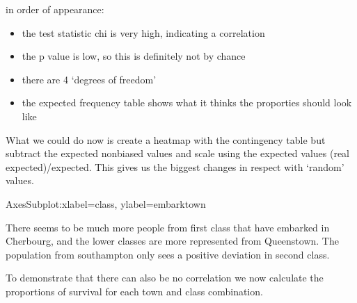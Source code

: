 \documentclass[letterpaper,10pt,english]{jupyterBook}
\begin{document}
\sphinxAtStartPar
in order of appearance:
\begin{itemize}
\item {} 
\sphinxAtStartPar
the test statistic chi is very high, indicating a correlation

\item {} 
\sphinxAtStartPar
the p value is low, so this is definitely not by chance

\item {} 
\sphinxAtStartPar
there are 4 ‘degrees of freedom’

\item {} 
\sphinxAtStartPar
the expected frequency table shows what it thinks the proporties should look like

\end{itemize}

\sphinxAtStartPar
What we could do now is create a heatmap with the contingency table but subtract the expected non\sphinxhyphen{}biased values and scale using the expected values (real \sphinxhyphen{} expected)/expected.
This gives us the biggest changes in respect with ‘random’ values.

\begin{sphinxVerbatim}[commandchars=\\\{\}]
      
\end{sphinxVerbatim}

\begin{sphinxVerbatim}[commandchars=\\\{\}]
\PYGZlt{}AxesSubplot:xlabel=\PYGZsq{}class\PYGZsq{}, ylabel=\PYGZsq{}embark\PYGZus{}town\PYGZsq{}\PYGZgt{}
\end{sphinxVerbatim}

\noindent{}

\sphinxAtStartPar
There seems to be much more people from first class that have embarked in Cherbourg, and the lower classes are more represented from Queenstown.
The population from southampton only sees a positive deviation in second class.

\sphinxAtStartPar
To demonstrate that there can also be no correlation we now calculate the proportions of survival for each town and class combination.
\end{document}
